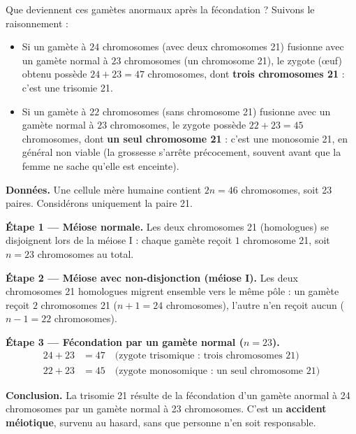 \documentclass[11pt]{article}
\newcommand{\cle}[1]{{\popxbold\color{popdark}#1}}
\begin{document}
Que deviennent ces gamètes anormaux après la fécondation ? Suivons le raisonnement :

\begin{itemize}
\item Si un gamète à $24$ chromosomes (avec deux chromosomes 21) fusionne avec un gamète normal à $23$ chromosomes (un chromosome 21), le \cle{zygote} (œuf) obtenu possède $24 + 23 = 47$ chromosomes, dont \textbf{trois chromosomes 21} : c'est une \cle{trisomie} 21.
\item Si un gamète à $22$ chromosomes (sans chromosome 21) fusionne avec un gamète normal à $23$ chromosomes, le zygote possède $22 + 23 = 45$ chromosomes, dont \textbf{un seul chromosome 21} : c'est une \cle{monosomie} 21, en général non viable (la grossesse s'arrête précocement, souvent avant que la femme ne sache qu'elle est enceinte).
\end{itemize}

\begin{experience}
\textbf{Données.} Une cellule mère humaine contient $2n = 46$ chromosomes, soit 23 paires. Considérons uniquement la paire 21.

\textbf{Étape 1 — Méiose normale.} Les deux chromosomes 21 (homologues) se disjoignent lors de la méiose I : chaque gamète reçoit $1$ chromosome 21, soit $n = 23$ chromosomes au total.

\textbf{Étape 2 — Méiose avec non-disjonction (méiose I).} Les deux chromosomes 21 homologues migrent ensemble vers le même pôle : un gamète reçoit $2$ chromosomes 21 ($n+1 = 24$ chromosomes), l'autre n'en reçoit aucun ($n-1 = 22$ chromosomes).

\textbf{Étape 3 — Fécondation par un gamète normal ($n = 23$).}
\begin{align*}
24 + 23 &= 47 \quad \text{(zygote trisomique : trois chromosomes 21)}\\
22 + 23 &= 45 \quad \text{(zygote monosomique : un seul chromosome 21)}
\end{align*}

\textbf{Conclusion.} La trisomie 21 résulte de la fécondation d'un gamète anormal à 24 chromosomes par un gamète normal à 23 chromosomes. C'est un \textbf{accident méiotique}, survenu au hasard, sans que personne n'en soit responsable.
\end{experience}
\end{document}
